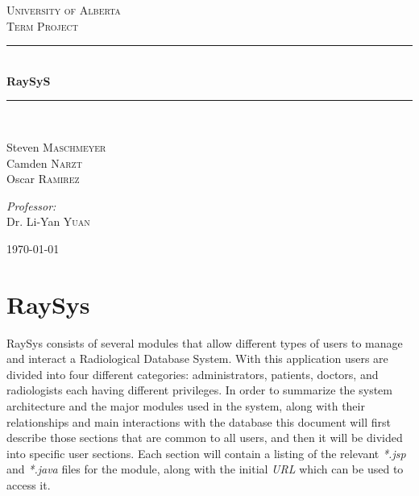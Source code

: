 \documentclass[11pt]{report}
\newcommand{\HRule}{\rule{\linewidth}{0.5mm}}
\begin{document}
\begin{titlepage}

\begin{center}


\textsc{\LARGE University of Alberta}\\[1.5cm]

\textsc{\Large Term Project}\\[0.5cm]


\HRule \\[0.4cm]
{ \huge \bfseries RaySyS}\\[0.4cm]

\HRule \\[1.5cm]

\begin{minipage}{0.4\textwidth}
\begin{flushleft} \large
Steven  \textsc{Maschmeyer}\\
Camden  \textsc{Narzt}\\
Oscar  \textsc{Ramirez}
\end{flushleft}
\end{minipage}
\begin{minipage}{0.4\textwidth}
\begin{flushright} \large
\emph{Professor:} \\
Dr. Li-Yan \textsc{Yuan}
\end{flushright}


\end{minipage}

\vfill

{\large \today}

\end{center}

\end{titlepage}
\chapter*{RaySys}
RaySys consists of several modules that allow different types of users to manage and interact a Radiological Database System. With this application users are divided into four different categories: administrators, patients, doctors, and radiologists each having different privileges. In order to summarize the system architecture and the major modules used in the system, along with their relationships and main interactions with the database this document will first describe those sections that are common to all users, and then it will be divided into specific user sections. Each section will contain a listing of the relevant \emph{*.jsp} and \emph{*.java} files for the module, along with the initial \emph{URL} which can be used to access it.
\end{document}
